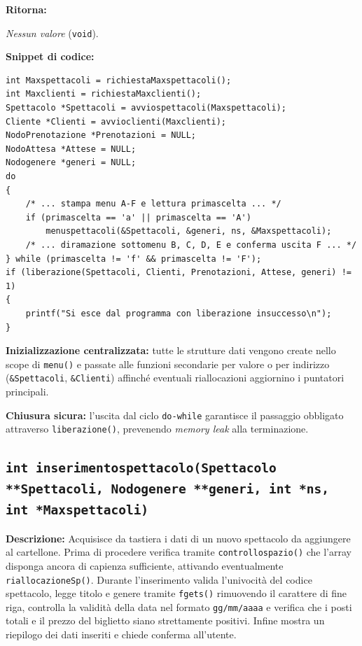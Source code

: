 \documentclass[11pt,a4paper,oneside,openany]{book}
\newenvironment{listacomp}{%
    \small
    \begin{list}{\textendash}{%
        \setlength{\topsep}{2pt}%
        \setlength{\partopsep}{0pt}%
        \setlength{\itemsep}{1pt}%
        \setlength{\parsep}{0pt}%
        \setlength{\leftmargin}{1.2em}%
    }%
}{%
    \end{list}%
}
\begin{document}
\noindent\textbf{Ritorna:}
\begin{listacomp}
    \item \textit{Nessun valore} (\texttt{void}).
\end{listacomp}

\begin{samepage}
\noindent\textbf{Snippet di codice:}
\begin{lstlisting}[caption={Inizializzazione, ciclo principale e rilascio memoria in menu()}]
int Maxspettacoli = richiestaMaxspettacoli();
int Maxclienti = richiestaMaxclienti();
Spettacolo *Spettacoli = avviospettacoli(Maxspettacoli);
Cliente *Clienti = avvioclienti(Maxclienti);
NodoPrenotazione *Prenotazioni = NULL;
NodoAttesa *Attese = NULL;
Nodogenere *generi = NULL;
do
{
    /* ... stampa menu A-F e lettura primascelta ... */
    if (primascelta == 'a' || primascelta == 'A')
        menuspettacoli(&Spettacoli, &generi, ns, &Maxspettacoli);
    /* ... diramazione sottomenu B, C, D, E e conferma uscita F ... */
} while (primascelta != 'f' && primascelta != 'F');
if (liberazione(Spettacoli, Clienti, Prenotazioni, Attese, generi) != 1)
{
    printf("Si esce dal programma con liberazione insuccesso\n");
}
\end{lstlisting}

\begin{listacomp}
    \item \textbf{Inizializzazione centralizzata:} tutte le strutture dati vengono create nello scope di \texttt{menu()} e passate alle funzioni secondarie per valore o per indirizzo (\texttt{\&Spettacoli}, \texttt{\&Clienti}) affinché eventuali riallocazioni aggiornino i puntatori principali.
    \item \textbf{Chiusura sicura:} l'uscita dal ciclo \texttt{do-while} garantisce il passaggio obbligato attraverso \texttt{liberazione()}, prevenendo \emph{memory leak} alla terminazione.
\end{listacomp}
\end{samepage}

\subsection[inserimentospettacolo()]{\texttt{int inserimentospettacolo(Spettacolo **Spettacoli, Nodogenere **generi, int *ns, int *Maxspettacoli)}}\label{sec:inserimentospettacolo}

\noindent\textbf{Descrizione:}
Acquisisce da tastiera i dati di un nuovo spettacolo da aggiungere al cartellone. Prima di procedere verifica tramite \texttt{controllospazio()} che l'array disponga ancora di capienza sufficiente, attivando eventualmente \texttt{riallocazioneSp()}. Durante l'inserimento valida l'univocità del codice spettacolo, legge titolo e genere tramite \texttt{fgets()} rimuovendo il carattere di fine riga, controlla la validità della data nel formato \texttt{gg/mm/aaaa} e verifica che i posti totali e il prezzo del biglietto siano strettamente positivi. Infine mostra un riepilogo dei dati inseriti e chiede conferma all'utente.
\end{document}
